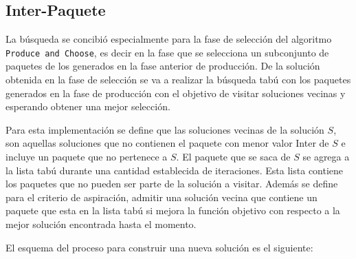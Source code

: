 \subsection{Inter-Paquete}
La búsqueda se concibió especialmente para la fase de selección del algoritmo \texttt{Produce and Choose}, es decir en la fase que se selecciona un subconjunto de paquetes de los generados en la fase anterior de producción. De la solución obtenida en la fase de selección se va a realizar la búsqueda tabú con los paquetes generados en la fase de producción con el objetivo de visitar soluciones vecinas y esperando obtener una mejor selección.

Para esta implementación se define que las soluciones vecinas de la solución $S$, son aquellas soluciones que no contienen el paquete con menor valor Inter de $S$ e incluye un paquete que no pertenece a $S$. El paquete que se saca de $S$ se agrega a la lista tabú durante una cantidad establecida de
iteraciones. Esta lista contiene los paquetes que no pueden ser parte de la solución a visitar. Además se define para el criterio de aspiración, admitir una solución vecina que contiene un paquete que esta en la lista tabú si mejora la función objetivo con respecto a la mejor solución encontrada hasta el momento. 

El esquema del proceso para construir una nueva soluci\'on es el siguiente:

